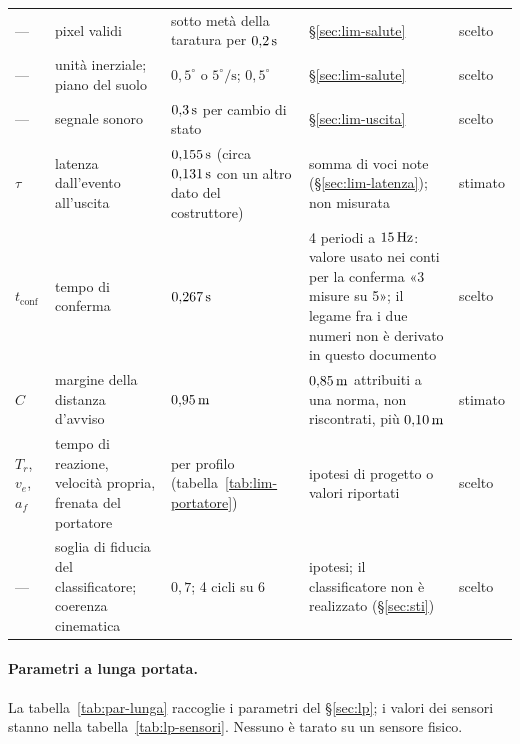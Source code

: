 \begin{table}[H]
\begin{tabularx}{\linewidth}{@{}p{1.25cm}Lp{3.5cm}Lp{1.2cm}@{}}
--- & pixel validi & sotto metà della taratura per $0{,}2\,\mathrm{s}$ & \S\ref{sec:lim-salute} & scelto\\
--- & unità inerziale; piano del suolo & $0{,}5^\circ$ o $5^\circ/\mathrm{s}$; $0{,}5^\circ$ & \S\ref{sec:lim-salute} & scelto\\
--- & segnale sonoro & $0{,}3\,\mathrm{s}$ per cambio di stato & \S\ref{sec:lim-uscita} & scelto\\
$\tau$ & latenza dall'evento all'uscita & $0{,}155\,\mathrm{s}$ (circa $0{,}131\,\mathrm{s}$ con un altro dato del costruttore) & somma di voci note (\S\ref{sec:lim-latenza}); non misurata & stimato\\
$t_{\mathrm{conf}}$ & tempo di conferma & $0{,}267\,\mathrm{s}$ & 4 periodi a $15\,\mathrm{Hz}$: valore usato nei conti per la conferma «3 misure su 5»; il legame fra i due numeri non è derivato in questo documento & scelto\\
$C$ & margine della distanza d'avviso & $0{,}95\,\mathrm{m}$ & $0{,}85\,\mathrm{m}$ attribuiti a una norma, non riscontrati, più $0{,}10\,\mathrm{m}$ & stimato\\
$T_r$, $v_e$, $a_f$ & tempo di reazione, velocità propria, frenata del portatore & per profilo (tabella~\ref{tab:lim-portatore}) & ipotesi di progetto o valori riportati & scelto\\
--- & soglia di fiducia del classificatore; coerenza cinematica & $0{,}7$; 4 cicli su 6 & ipotesi; il classificatore non è realizzato (\S\ref{sec:sti}) & scelto\\
\bottomrule
\end{tabularx}
\end{table}

\paragraph{Parametri a lunga portata.} La tabella~\ref{tab:par-lunga} raccoglie i parametri del \S\ref{sec:lp}; i valori dei sensori stanno nella tabella~\ref{tab:lp-sensori}. Nessuno è tarato su un sensore fisico.

